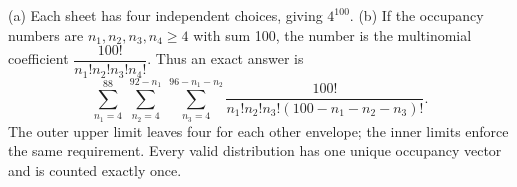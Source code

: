 (a) Each sheet has four independent choices, giving $\boxed{4^{100}}$. (b) If the occupancy numbers are $n_1,n_2,n_3,n_4\ge4$ with sum 100, the number is the multinomial coefficient $\dfrac{100!}{n_1!n_2!n_3!n_4!}$. Thus an exact answer is\[\boxed{\sum_{n_1=4}^{88}\ \sum_{n_2=4}^{92-n_1}\ \sum_{n_3=4}^{96-n_1-n_2}\dfrac{100!}{n_1!n_2!n_3!(100-n_1-n_2-n_3)!}}.\]The outer upper limit leaves four for each other envelope; the inner limits enforce the same requirement. Every valid distribution has one unique occupancy vector and is counted exactly once.
